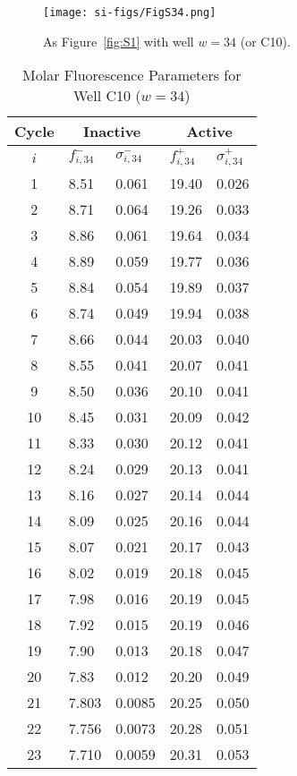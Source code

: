                 \begin{figure}
                    \centering
                    \texttt{[image: si-figs/FigS34.png]}
                    \caption{
                        As Figure~\ref{fig:S1} with well $w=34$ (or C10).
                    }
                \end{figure}
                \clearpage
    \begin{table}
        \caption{Molar Fluorescence Parameters for Well C10 ($w=34$)}
        \centering
        \begin{tabular}{c|ll|ll}
            Cycle & \multicolumn{2}{c|}{Inactive} & \multicolumn{2}{c}{Active} \\
            \hline
            $i$ & $f_{i,34}^{-}$ & $\sigma_{i,34}^{-}$ &  $f_{i,34}^{+}$ & $\sigma_{i,34}^{+}$ \\
            \hline
    1 & 8.51 & 0.061 & 19.40 & 0.026 \\
2 & 8.71 & 0.064 & 19.26 & 0.033 \\
3 & 8.86 & 0.061 & 19.64 & 0.034 \\
4 & 8.89 & 0.059 & 19.77 & 0.036 \\
5 & 8.84 & 0.054 & 19.89 & 0.037 \\
6 & 8.74 & 0.049 & 19.94 & 0.038 \\
7 & 8.66 & 0.044 & 20.03 & 0.040 \\
8 & 8.55 & 0.041 & 20.07 & 0.041 \\
9 & 8.50 & 0.036 & 20.10 & 0.041 \\
10 & 8.45 & 0.031 & 20.09 & 0.042 \\
11 & 8.33 & 0.030 & 20.12 & 0.041 \\
12 & 8.24 & 0.029 & 20.13 & 0.041 \\
13 & 8.16 & 0.027 & 20.14 & 0.044 \\
14 & 8.09 & 0.025 & 20.16 & 0.044 \\
15 & 8.07 & 0.021 & 20.17 & 0.043 \\
16 & 8.02 & 0.019 & 20.18 & 0.045 \\
17 & 7.98 & 0.016 & 20.19 & 0.045 \\
18 & 7.92 & 0.015 & 20.19 & 0.046 \\
19 & 7.90 & 0.013 & 20.18 & 0.047 \\
20 & 7.83 & 0.012 & 20.20 & 0.049 \\
21 & 7.803 & 0.0085 & 20.25 & 0.050 \\
22 & 7.756 & 0.0073 & 20.28 & 0.051 \\
23 & 7.710 & 0.0059 & 20.31 & 0.053 \\

\end{tabular}
\end{table}
